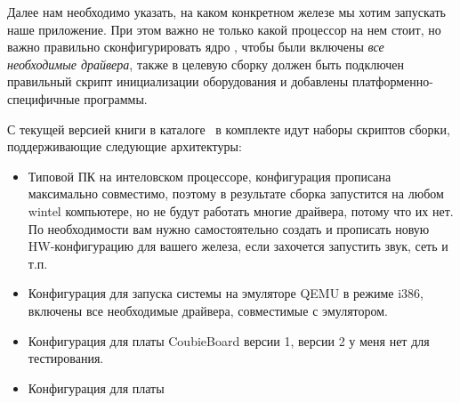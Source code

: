 
Далее нам необходимо указать, на каком конкретном железе мы хотим запускать наше
приложение. При этом важно не только какой процессор на нем стоит, но важно
правильно сконфигурировать ядро \linux, чтобы были включены \emph{все
необходимые драйвера}, также в целевую сборку должен быть подключен правильный
скрипт инициализации оборудования и добавлены платформенно-специфичные
программы.



С текущей версией книги в каталоге \ в комплекте идут наборы
скриптов сборки, поддерживающие следующие архитектуры:

\begin{itemize}
  \item {} Типовой ПК на интеловском процессоре, конфигурация
  прописана максимально совместимо, поэтому в результате сборка запустится на
  любом wintel компьютере, но не будут работать многие драйвера, потому что их
  нет. По необходимости вам нужно самостоятельно создать и прописать новую
  HW-конфигурацию для вашего железа, если захочется запустить звук, сеть и т.п.
  \item {}
  Конфигурация для запуска системы на эмуляторе QEMU в режиме i386, включены
  все необходимые драйвера, совместимые с эмулятором.
  \item {}
  Конфигурация для платы CoubieBoard версии 1, версии 2 у меня нет для
  тестирования.
  \item {}
  Конфигурация для платы \raspi
\end{itemize}
